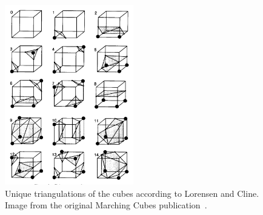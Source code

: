 \begin{figure}
  \centering
  \includegraphics[width=0.5\textwidth]{Images/MCTable.pdf}
  \caption{Unique triangulations of the cubes according to Lorensen and
  Cline. Image from the original Marching Cubes publication~\cite{MC}.}
  \label{fig:MCTable}
\end{figure}

